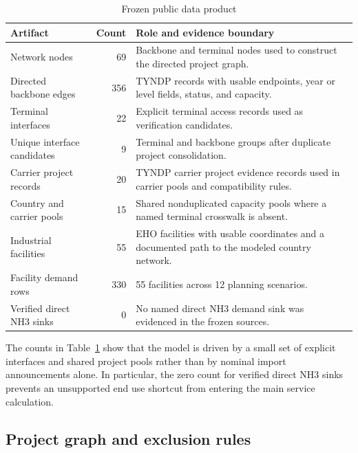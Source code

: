 \documentclass{ieeeaccess}
\begin{document}
\begin{table}[t]
\centering
\caption{Frozen public data product}
\label{tab:data-product}
\scriptsize
\begin{tabularx}{\textwidth}{p{3.4cm}rX}
\toprule
Artifact & Count & Role and evidence boundary \\
\midrule
Network nodes & 69 & Backbone and terminal nodes used to construct the directed project graph. \\
Directed backbone edges & 356 & TYNDP records with usable endpoints, year or level fields, status, and capacity. \\
Terminal interfaces & 22 & Explicit terminal access records used as verification candidates. \\
Unique interface candidates & 9 & Terminal and backbone groups after duplicate project consolidation. \\
Carrier project records & 20 & TYNDP carrier project evidence records used in carrier pools and compatibility rules. \\
Country and carrier pools & 15 & Shared nonduplicated capacity pools where a named terminal crosswalk is absent. \\
Industrial facilities & 55 & EHO facilities with usable coordinates and a documented path to the modeled country network. \\
Facility demand rows & 330 & 55 facilities across 12 planning scenarios. \\
Verified direct NH3 sinks & 0 & No named direct NH3 demand sink was evidenced in the frozen sources. \\
\bottomrule
\end{tabularx}
\end{table}

The counts in Table~\ref{tab:data-product} show that the model is driven by a small set of explicit interfaces and shared project pools rather than by nominal import announcements alone. In particular, the zero count for verified direct NH3 sinks prevents an unsupported end use shortcut from entering the main service calculation.

\subsection{Project graph and exclusion rules}
\end{document}
